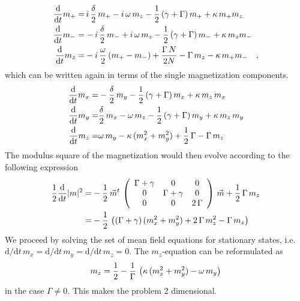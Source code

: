 \documentclass{article}
\begin{document}
\begin{align*}
    \frac{\text{d}}{\text{d}t} m_+=&\,i\,\frac{\delta}{2}\,m_+-i\,\omega\,m_z-\frac{1}{2}\,(\gamma+\Gamma)\,m_++\kappa\,m_+ m_z\\
    \frac{\text{d}}{\text{d}t} m_-=&-i\,\frac{\delta}{2}\,m_-+i\,\omega\,m_z-\frac{1}{2}\,(\gamma+\Gamma)\,m_- +\kappa\,m_z m_-\\
    \frac{\text{d}}{\text{d}t} m_z=&-i\,\frac{\omega}{2}\,(m_+ - m_-)+\frac{\Gamma\,N}{2N}-\Gamma\,m_z - \kappa\,m_+ m_-\quad,
\end{align*}
which can be written again in terms of the single magnetization components.
\begin{align*}
    \frac{\text{d}}{\text{d}t} m_x =&-\frac{\delta}{2}\,m_y-\frac{1}{2}\,(\gamma+\Gamma)\,m_x+\kappa\,m_z\,m_x\\
    \frac{\text{d}}{\text{d}t} m_y =&\frac{\delta}{2}\,m_x-\omega\,m_z-\frac{1}{2}\,(\gamma+\Gamma)\,m_y+\kappa\,m_z\,m_y\\
    \frac{\text{d}}{\text{d}t} m_z=&\omega\,m_y  - \kappa\,(m_x^2+ m_y^2)+\frac{1}{2}\,\Gamma-\Gamma\,m_z
\end{align*}
The modulus square of the magnetization would then evolve according to the following expression 
\begin{align*}
    \frac{1}{2}\frac{\text{d}}{\text{d}t} |m|^2=&-\frac{1}{2}\,\vec{m}^t\,\left( \begin{array}{ccc}
         \Gamma+\gamma & 0&0  \\
         0& \Gamma+\gamma & 0\\
         0&0&2\,\Gamma
    \end{array}\right)\,\vec{m}+\frac{1}{2}\,\Gamma\,m_z\\
    =&-\frac{1}{2}\,\left(  (\Gamma+\gamma)\,(m_x^2+m_y^2)+2\,\Gamma\,m_z^2-\Gamma\,m_z \right)
\end{align*}
We proceed by solving the set of mean field equations for stationary states, i.e. $\text{d}/\text{d}t\,m_x=\text{d}/\text{d}t\,m_y=\text{d}/\text{d}t\,m_z=0$. The $m_z$-equation can be reformulated as
\begin{align*}
    m_z=\frac{1}{2}-\frac{1}{\Gamma}\,\left(\kappa\,(m_x^2+ m_y^2)-\omega\,m_y  \right)
\end{align*}
in the case $\Gamma\neq0$. This makes the problem 2 dimensional.
\end{document}

